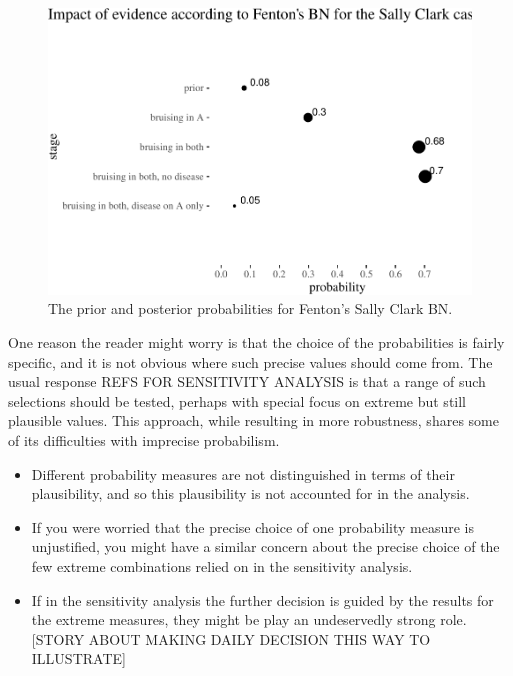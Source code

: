 \documentclass[
  10pt,
  dvipsnames,enabledeprecatedfontcommands]{scrartcl}
\begin{document}
\begin{figure}

\begin{center}\includegraphics[width=1\linewidth]{imprecision_weight_files/figure-latex/SCfentonTable2-1} \end{center}
\caption{The prior and posterior probabilities for Fenton's Sally Clark BN.}
\label{fig:SCfentonTable}
\end{figure}

One reason the reader might worry is that the choice of the
probabilities is fairly specific, and it is not obvious where such
precise values should come from. The usual response REFS FOR SENSITIVITY
ANALYSIS is that a range of such selections should be tested, perhaps
with special focus on extreme but still plausible values. This approach,
while resulting in more robustness, shares some of its difficulties with
imprecise probabilism.

\begin{itemize}
\item
  Different probability measures are not distinguished in terms of their
  plausibility, and so this plausibility is not accounted for in the
  analysis.
\item
  If you were worried that the precise choice of one probability measure
  is unjustified, you might have a similar concern about the precise
  choice of the few extreme combinations relied on in the sensitivity
  analysis.
\item
  If in the sensitivity analysis the further decision is guided by the
  results for the extreme measures, they might be play an undeservedly
  strong role. {[}STORY ABOUT MAKING DAILY DECISION THIS WAY TO
  ILLUSTRATE{]}
\end{itemize}
\end{document}
